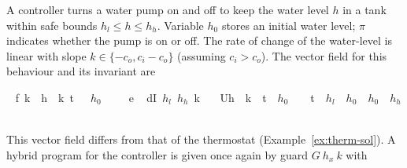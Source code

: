 \documentclass[envcountsame,envcountsect]{llncs}
\begin{document}
\begin{example}\label{ex:tank-inv}
  A controller turns a water pump on and off to keep the water level
  $h$ in a tank within safe bounds $h_l\leq h\leq h_h$.  Variable
  $h_0$ stores an initial water level;  $\pi$ indicates whether the pump is
  on or off. The rate of change of the water-level is
  linear with slope $k\in\{-c_o,c_i-c_o\}$ (assuming $c_i>c_o$). The
  vector field for this behaviour and its invariant are
\begin{isabellebody}
\isanewline
{}\ %
{\isachardoublequoteopen}f\ k\ {\isasymequiv}\ {\isasymlbrakk}{\isacharbrackleft}h\ {\isasymmapsto}\ k{\isacharcomma}\ t\ {\isasymmapsto}\ {}{\isacharcomma}\ $h_0$\ {\isasymmapsto}\ {}{\isacharcomma}\ {\isasympi}\ {\isasymmapsto}\ {}{\isacharbrackright}{\isasymrbrakk}\isactrlsub e{\isachardoublequoteclose}\isanewline
\isanewline
{}\ %
{\isachardoublequoteopen}dI\ $h_l$\ $h_h$\ k\ {\isasymequiv}\isanewline
\ \ U{\isacharparenleft}h\ {\isacharequal}\ k\ {\isasymcdot}\ t\
{\isacharplus}\ $h_0$\ {\isasymand}\ {}\ {\isasymle}\ t\
{\isasymand}\ $h_l$\ {\isasymle}\ $h_0$\ {\isasymand}\ $h_0$\
{\isasymle}\ $h_h$\ {\isasymand}\ {\isacharparenleft}{\isasympi}\
{\isacharequal}\ {}\ {\isasymor}\ {\isasympi}\
{\isacharequal}\
{}{\isacharparenright}{\isacharparenright}{\isachardoublequoteclose}
\isanewline
\end{isabellebody}
\noindent This vector field differs from that of the thermostat
(Example~\ref{ex:therm-sol}). A hybrid program for the controller is
given once again by guard $G\ h_x\ k$ with

\end{example}
\end{document}
